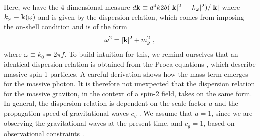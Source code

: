 \documentclass[prd,twocolumn,aps,psfig,nofootinbib,nobibnotes,superscriptaddress,preprintnumbers,times]{revtex4-2}
\begin{document}
Here, we have the 4-dimensional measure $d{\bf k} \equiv d^4 k 2\delta(|{\bf k}|^2 - |k_{\omega}|^2)/|{\bf k}|$ where $k_{\omega} \equiv {\bf k}(\omega)$ and is given by the dispersion relation, which comes from imposing the on-shell condition \cite{Liang:2021bct} and is of the form 
\begin{equation}\label{eq:dispersion}
    \omega^2 = |{\bf k}|^2+ m_g^2 \ ,
\end{equation}
where $\omega \equiv k_0 = 2\pi f$.
To build intuition for this, we remind ourselves that an identical dispersion relation is obtained from the Proca equations \cite{Proca:1936fbw}, which describe massive spin-1 particles. A careful derivation shows how the mass term emerges \cite{Wang:2024kir} for the massive photon. It is therefore not unexpected that the dispersion relation for the massive graviton, in the context of a spin-2 field, takes on the same form. In general, the dispersion relation is dependent on the scale factor $a$ and the propagation speed of gravitational waves $c_g$ \cite{Gumrukcuoglu:2012wt}. We assume that $a=1$, since we are observing the gravitational waves at the present time, and $c_g = 1$, based on observational constraints \cite{LIGOScientific:2017vwq, LIGOScientific:2017zic, LIGOScientific:2017ync}.
\end{document}
